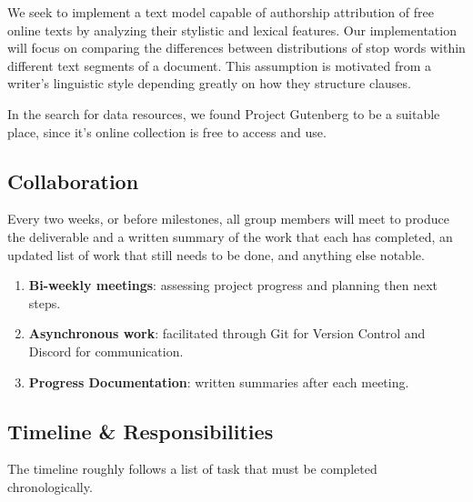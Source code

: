 \documentclass[sigconf, nonacm]{acmart}
\begin{document}
We seek to implement a text model capable of authorship attribution of free online texts by analyzing their stylistic and lexical features. 
Our implementation will focus on comparing the differences between distributions of stop words within different text segments of a document.
This assumption is motivated from a writer's linguistic style depending greatly on how they structure clauses. 

In the search for data resources, we found Project Gutenberg to be a suitable place, since it's online collection is free to access and use. 



\subsection{Collaboration}

Every two weeks, or before milestones, all group members will meet to produce the deliverable
and a written summary of the work that each has completed, an updated list of work that still 
needs to be done, and anything else notable. 

\begin{enumerate}
  \item \textbf{Bi-weekly meetings}: assessing project progress and planning then next steps. 
  \item \textbf{Asynchronous work}: facilitated through Git for Version Control and Discord for communication. 
  \item \textbf{Progress Documentation}: written summaries after each meeting.  
\end{enumerate}

\subsection{Timeline \& Responsibilities}

The timeline roughly follows a list of task that must be completed chronologically. 
\end{document}
